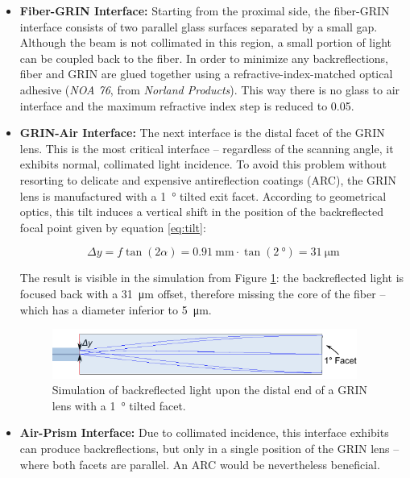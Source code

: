 \begin{itemize}

\item \textbf{Fiber-GRIN Interface:}
Starting from the proximal side, the fiber-GRIN interface consists of two parallel glass surfaces separated by a small gap. Although the beam is not collimated in this region, a small portion of light can be coupled back to the fiber. In order to minimize any backreflections, fiber and GRIN are glued together using a refractive-index-matched optical adhesive (\textit{NOA 76}, from \textit{Norland Products}). This way there is no glass to air interface and the maximum refractive index step is reduced to \SI{0.05}{}.

\item \textbf{GRIN-Air Interface:}
The next interface is the distal facet of the GRIN lens. This is the most critical interface -- regardless of the scanning angle, it exhibits normal, collimated light incidence. To avoid this problem without resorting to delicate and expensive antireflection coatings (ARC), the GRIN lens is manufactured with a \SI{1}{\degree} tilted exit facet. According to geometrical optics, this tilt induces a vertical shift in the position of the backreflected focal point given by equation \ref{eq:tilt}:

\begin{equation}
\Delta y = f \tan(2\alpha) = \SI{0.91}{\milli\meter} \cdot \tan (\SI{2}{\degree}) = \SI{31}{\micro\meter}
\label{eq:tilt}
\end{equation}

The result is visible in the simulation from Figure \ref{fig:tilt}: the backreflected light is focused back with a \SI{31}{\micro\meter} offset, therefore missing the core of the fiber -- which has a diameter inferior to \SI{5}{\micro\meter}.

\begin{figure}[h!]\centering
      \includegraphics[width=10cm]{figures/30_DesignSimulation/Optical/backreflection.pdf}
      \caption{Simulation of backreflected light upon the distal end of a GRIN lens with a \SI{1}{\degree} tilted facet.}
      \label{fig:tilt}
\end{figure}

\item \textbf{Air-Prism Interface:} Due to collimated incidence, this interface exhibits can produce backreflections, but only in a single position of the GRIN lens -- where both facets are parallel. An ARC would be nevertheless beneficial. 


\end{itemize}
